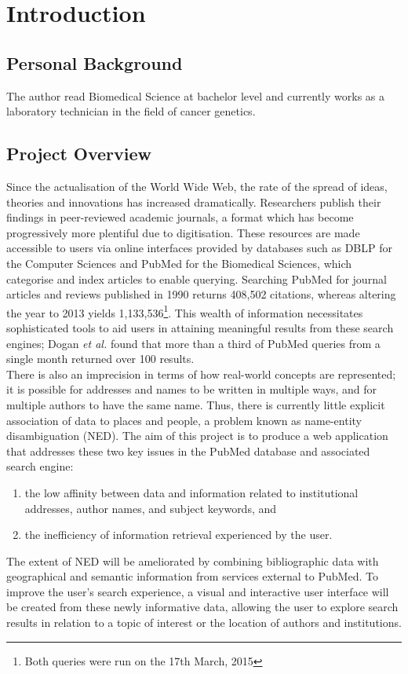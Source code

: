 \documentclass[PROP_AGutteridge_CS.tex]{subfiles}
\begin{document}
\chapter{Introduction}
\section{Personal Background}
The author read Biomedical Science at bachelor level and currently works as a laboratory technician in the field of cancer genetics.

\section{Project Overview}
Since the actualisation of the World Wide Web, the rate of the spread of ideas, theories and innovations has increased dramatically. Researchers publish their findings in peer-reviewed academic journals, a format which has become progressively more plentiful due to digitisation. These resources are made accessible to users via online interfaces provided by databases such as DBLP for the Computer Sciences and PubMed for the Biomedical Sciences, which categorise and index articles to enable querying. Searching PubMed for journal articles and reviews published in 1990 returns 408,502 citations, whereas altering the year to 2013 yields 1,133,536\footnote{Both queries were run on the 17th March, 2015}. This wealth of information necessitates sophisticated tools to aid users in attaining meaningful results from these search engines; Dogan \emph{et al.}\cite{dogan} found that more than a third of PubMed queries from a single month returned over 100 results.\\

\noindent There is also an imprecision in terms of how real-world concepts are represented; it is possible for addresses and names to be written in multiple ways, and for multiple authors to have the same name. Thus, there is currently little explicit association of data to places and people, a problem known as name-entity disambiguation (NED)\cite{hoffart}. The aim of this project is to produce a web application that addresses these two key issues in the PubMed database and associated search engine:
\begin{enumerate}
\item the low affinity between data and information related to institutional addresses, author names, and subject keywords, and
\item the inefficiency of information retrieval experienced by the user.
\end{enumerate}
The extent of NED will be ameliorated by combining bibliographic data with geographical and semantic information from services external to PubMed. To improve the user's search experience, a visual and interactive user interface will be created from these newly informative data, allowing the user to explore search results in relation to a topic of interest or the location of authors and institutions. 
\end{document}
